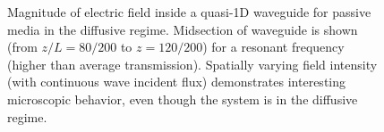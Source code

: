 \begin{figure}
\vskip -0.5cm
\centerline{
}
\vskip -0.5cm
\caption[Magnitude of electric field inside a quasi-1D waveguide for passive media in the diffusive regime.]{Magnitude of electric field inside a quasi-1D waveguide for passive media in the diffusive regime. Midsection of waveguide is shown (from $z/L=80/200$ to $z=120/200$) for a resonant frequency (higher than average transmission). Spatially varying field intensity (with continuous wave incident flux) demonstrates interesting microscopic behavior, even though the system is in the diffusive regime.
\label{fig:electric_field_zoomed}}
\end{figure}

